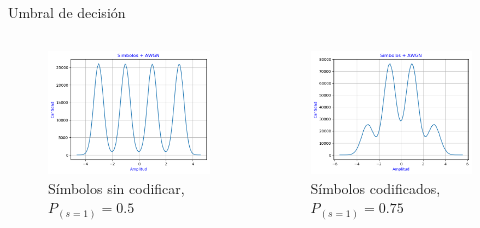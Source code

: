 \documentclass[xcolor=table]{beamer}
\begin{document}
\begin{frame}{Umbral de decisión}
\begin{columns}
    \begin{column}{0.48\paperwidth}
    \begin{figure}
        \centering
        \includegraphics[width=\textwidth]{Graficos/Simbolos_05.png}%
        \caption{Símbolos sin codificar, $P_{(s=1)}=0.5$}
        \label{fig:my_label}
    \end{figure}
    
    \end{column}
    \begin{column}{0.48\paperwidth}  
    
    \begin{figure}
        \centering
         \includegraphics[width=\textwidth]{Graficos/Slicer_025.png}
        \caption{Símbolos codificados, $P_{(s=1)}=0.75$}
        \label{fig:my_label}
    \end{figure}
   
    \end{column}
\end{columns}
\end{frame}
\end{document}
